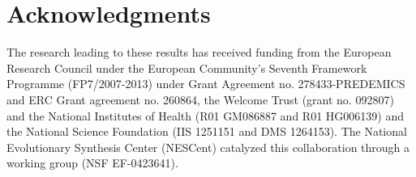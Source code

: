 
\chapter*{Acknowledgments}


\vfill{}

The research leading to these results has received funding from the European Research Council under the European Community's Seventh Framework Programme (FP7/2007-2013) under Grant Agreement no. 278433-PREDEMICS and ERC Grant agreement no. 260864, the Welcome Trust (grant no. 092807) and the National Institutes of Health (R01 GM086887 and R01 HG006139) and the National Science Foundation (IIS 1251151 and DMS 1264153).
The National Evolutionary Synthesis Center (NESCent) catalyzed this collaboration through a working group (NSF EF-0423641).

